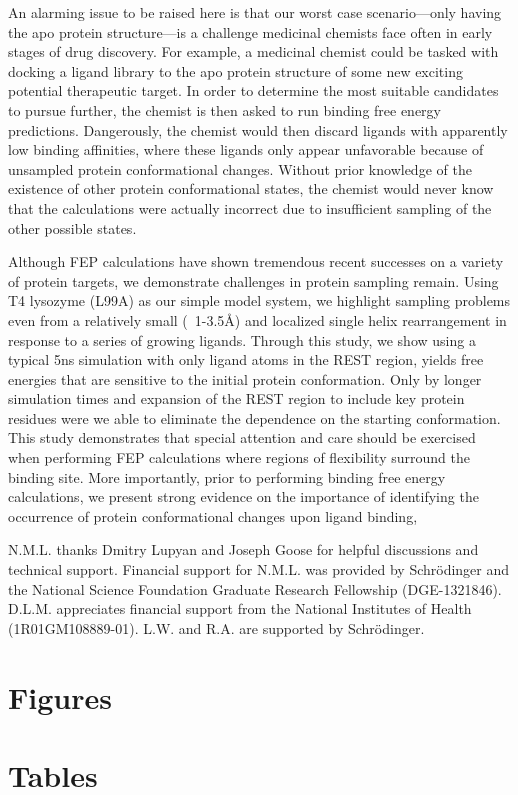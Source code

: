 \documentclass[journal=jctcce,manuscript=article]{achemso}
\begin{document}
An alarming issue to be raised here is that our worst case scenario---only having the apo protein structure---is a challenge medicinal chemists face often in early stages of drug discovery.
For example, a medicinal chemist could be tasked with docking a ligand library to the apo protein structure of some new exciting potential therapeutic target.
In order to determine the most suitable candidates to pursue further, the chemist is then asked to run binding free energy predictions. 
Dangerously, the chemist would then discard ligands with apparently low binding affinities, where these ligands only appear unfavorable because of unsampled protein conformational changes.
Without prior knowledge of the existence of other protein conformational states, the chemist would never know that the calculations were actually incorrect due to insufficient sampling of the other possible states.

Although FEP calculations have shown tremendous recent successes on a variety of protein targets\cite{FEPplus}, we demonstrate challenges in protein sampling remain. 
Using T4 lysozyme (L99A) as our simple model system, we highlight sampling problems even from a relatively small (~1-3.5\AA) and localized single helix rearrangement in response to a series of growing ligands.
Through this study, we show using a typical 5ns simulation with only ligand atoms in the REST region, yields free energies that are sensitive to the initial protein conformation. 
Only by longer simulation times and expansion of the REST region to include key protein residues were we able to eliminate the dependence on the starting conformation.
This study demonstrates that special attention and care should be exercised when performing FEP calculations where regions of flexibility surround the binding site.
More importantly, prior to performing binding free energy calculations, we present strong evidence on the importance of identifying the occurrence of protein conformational changes upon ligand binding, 

\begin{acknowledgement}
   N.M.L. thanks Dmitry Lupyan and Joseph Goose for helpful discussions and technical support. Financial support for N.M.L. was provided by Schr\"{o}dinger and the National Science Foundation Graduate Research Fellowship (DGE-1321846). D.L.M. appreciates financial support from the National Institutes of Health (1R01GM108889-01). L.W. and R.A. are supported by Schr\"{o}dinger.
\end{acknowledgement}

\pagebreak
\section*{Figures}



\clearpage
\section*{Tables}


\clearpage


%
\end{document}
